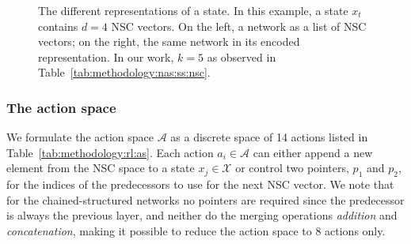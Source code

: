 \begin{figure}[ht]
\begin{center}
\caption{The different representations of a state. In this example, a state $x_t$ contains $d=4$ NSC vectors. On the left, a network as a list of NSC vectors; on the right, the same network in its encoded representation. In our work, $k=5$ as observed in Table~\ref{tab:methodology:nas:ss:nsc}.}
\label{fig:methodology:rl:states:img}
\end{center}
\end{figure}


\subsubsection{The action space}\label{sec:methodology:rl:as}

We formulate the action space $\mathcal{A}$ as a discrete space of 14 actions listed in Table~\ref{tab:methodology:rl:as}. Each action $a_i \in \mathcal{A}$ can either append a new element from the NSC space to a state $x_j \in \mathcal{X}$ or control two pointers, $p_1$ and $p_2$, for the indices of the predecessors to use for the next NSC vector. We note that for the chained-structured networks no pointers are required since the predecessor is always the previous layer, and neither do the merging operations \textit{addition} and \textit{concatenation}, making it possible to reduce the action space to 8 actions only.

